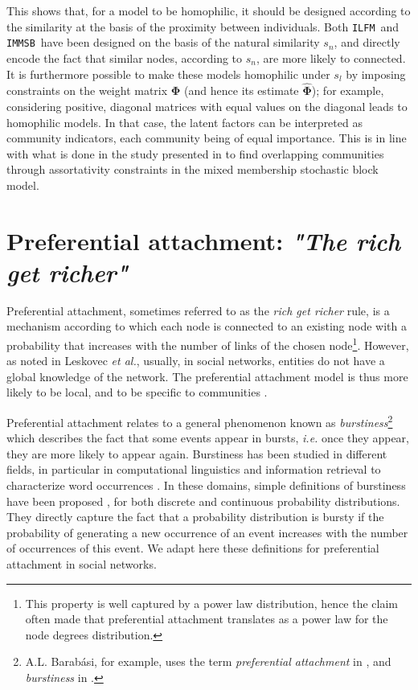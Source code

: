 \documentclass{llncs}
\newcommand{\ifm}{\texttt{ILFM}}
\newcommand{\imb}{\texttt{IMMSB}}
\newcommand{\mat}[1]{\mathbf{#1}}
\begin{document}
This shows that, for a model to be homophilic, it should be designed according to the similarity at the basis of the proximity between individuals. Both \ifm\ and \imb\ have been designed on the basis of the natural similarity $s_n$, and directly encode the fact that similar nodes, according to $s_n$, are more likely to connected.  It is furthermore possible to make these models homophilic under $s_l$ by imposing constraints on the weight matrix $\mat{\Phi}$ (and hence its estimate $\mat{\hat{\Phi}}$); for example, considering positive, diagonal matrices with equal values on the diagonal leads to homophilic models. In that case, the latent factors can be interpreted as community indicators, each community being of equal importance. This is in line with what is done in the study presented in \cite{AMMSB} to find overlapping communities through assortativity constraints in the mixed membership stochastic block model.

\section{Preferential attachment: \emph{"The rich get richer"}}
\label{sec:burstiness}

Preferential attachment, sometimes referred to as the \textit{rich get richer} rule, is a mechanism according to which each node is connected to an existing node with a probability that increases with the number of links of the chosen node\footnote{This property is well captured by a power law distribution, hence the claim often made that preferential attachment translates as a power law for the node degrees distribution.}. However, as noted in Leskovec \textit{et al.}, usually, in social networks, entities do not have a global knowledge of the network. The preferential attachment model is thus more likely to be local, and to be specific to communities \cite{LeskovecBKT08}.

Preferential attachment relates to a general phenomenon known as \textit{burstiness}\footnote{A.L. Barab\'asi, for example, uses the term \textit{preferential attachment} in \cite{barabasi1999emergence}, and \textit{burstiness} in \cite{barabasi_burst}.} which describes the fact that some events appear in bursts, \textit{i.e.} once they appear, they are more likely to appear again. Burstiness has been studied in different fields, in particular in computational linguistics and information retrieval to characterize word occurrences \cite{church1995poisson}. In these domains, simple definitions of burstiness have been proposed \cite{clinchant2008bnb,clinchant2010information}, for both discrete and continuous probability distributions. They directly capture the fact that a probability distribution is bursty if the probability of generating a new occurrence of an event increases with the number of occurrences of this event. We adapt here these definitions for preferential attachment in social networks.
\end{document}
